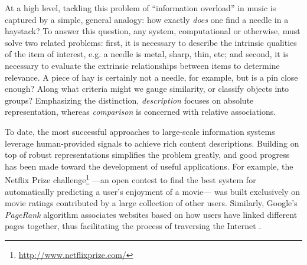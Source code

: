 At a high level, tackling this problem of ``information overload'' in music is captured by a simple, general analogy: how exactly \emph{does} one find a needle in a haystack?
To answer this question, any system, computational or otherwise, must solve two related problems:
first, it is necessary to describe the intrinsic qualities of the item of interest, e.g. a needle is metal, sharp, thin, etc;
and second, it is necessary to evaluate the extrinsic relationships between items to determine relevance.
A piece of hay is certainly not a needle, for example, but is a pin close enough?
Along what criteria might we gauge similarity, or classify objects into groups?
Emphasizing the distinction, \emph{description} focuses on absolute representation, whereas \emph{comparison} is concerned with relative associations.

To date, the most successful approaches to large-scale information systems leverage human-provided signals to achieve rich content descriptions.
Building on top of robust representations simplifies the problem greatly, and good progress has been made toward the development of useful applications.
For example, the Netflix Prize challenge\footnote{\url{http://www.netflixprize.com/}} ---an open contest to find the best system for automatically predicting a user's enjoyment of a movie--- was built exclusively on movie ratings contributed by a large collection of other users.
Similarly, Google's \emph{PageRank} algorithm associates websites based on how users have linked different pages together, thus facilitating the process of traversing the Internet \cite{Page1999}.

